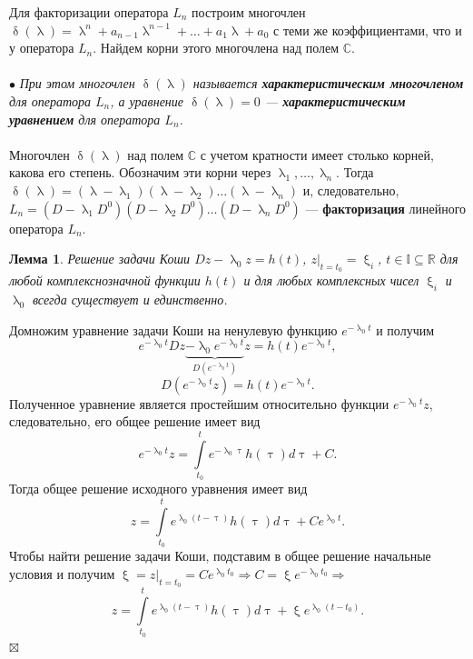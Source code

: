 \documentclass[a4paper, 12pt]{report}
\newenvironment{Proof} %
{\par\noindent{$\blacklozenge$}} %
{\hfill$\scriptstyle\boxtimes$}
\renewcommand{\delta}{\updelta}
\renewcommand{\lambda}{\uplambda}
\renewcommand{\xi}{\upxi}
\begin{document}
	Для факторизации оператора $L_n$ построим многочлен $\delta(\lambda) = \lambda^n+a_{n-1}\lambda^{n-1} + \ldots + a_1\lambda + a_0$ с теми же коэффициентами, что и у оператора $L_n$. Найдем корни этого многочлена над полем $\mathbb{C}$.\\\\
	$\bullet$ \textit{При этом многочлен $\delta(\lambda)$ называется \textbf{характеристическим многочленом} для оператора $L_n$, а уравнение $\delta(\lambda) = 0$ --- \textbf{характеристическим уравнением} для оператора $L_n$.}\\\\
	Многочлен $\delta(\lambda)$ над полем $\mathbb{C}$ с учетом кратности имеет столько корней, какова его степень. Обозначим эти корни через $\lambda_1,\ldots, \lambda_n$. Тогда $\delta(\lambda) = (\lambda - \lambda_1)(\lambda-\lambda_2)\ldots(\lambda - \lambda_n)$ и, следовательно, $L_n = (D-\lambda_1D^0)(D-\lambda_2D^0)\ldots(D-\lambda_nD^0)$ --- \textbf{факторизация} линейного оператора $L_n$.
	\newtheorem*{2_1_1}{Лемма}\begin{2_1_1}Решение задачи Коши $Dz - \lambda_0z = h(t)$, $z|_{t=t_0} = \xi_i$, $t\in\mathbb{I}\subseteq\mathbb{R}$ для любой комплекснозначной функции $h(t)$ и для любых комплексных чисел $\xi_i$ и $\lambda_0$ всегда существует и единственно.
	\end{2_1_1}\begin{Proof}
		Домножим уравнение задачи Коши на ненулевую функцию $e^{-\lambda_0t}$ и получим $$e^{-\lambda_0t}Dz \underbrace{ - \lambda_0 e^{-\lambda_0t}}_{D(e^{-\lambda_0t})}z = h(t) e^{-\lambda_0t},$$
		$$D(e^{-\lambda_0t}z)=h(t)e^{-\lambda_0t}.$$ Полученное уравнение является простейшим относительно функции $e^{-\lambda_0t}z$, следовательно, его общее решение имеет вид $$e^{-\lambda_0t}z = \int\limits_{t_0}^te^{-\lambda_0\uptau}h(\uptau)d\uptau + C.$$ Тогда общее решение исходного уравнения имеет вид $$z = \int\limits_{t_0}^te^{\lambda_0(t-\uptau)}h(\uptau)d\uptau + Ce^{\lambda_0t}.$$ Чтобы найти решение задачи Коши, подставим в общее решение начальные условия и получим $\xi = z|_{t=t_0} = Ce^{\lambda_0t_0}\Rightarrow C = \xi e^{-\lambda_0t_0}\Rightarrow$ $$z = \int\limits_{t_0}^te^{\lambda_0(t-\uptau)}h(\uptau)d\uptau + \xi e^{\lambda_0(t-t_0)}.$$
	\end{Proof}
\end{document}
